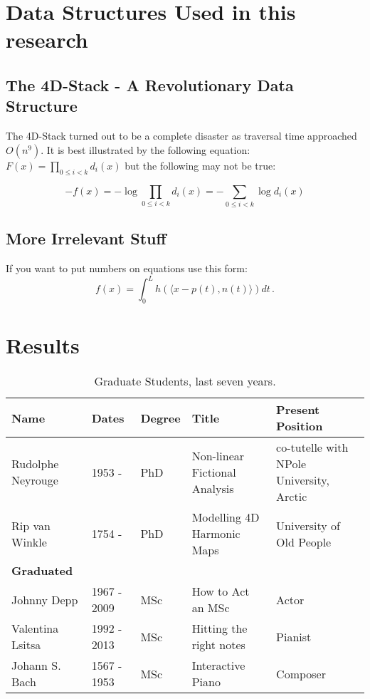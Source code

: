 \documentclass[11pt]{report}
\begin{document}

\chapter{Data Structures Used in this research}
\section{The 4D-Stack - A Revolutionary Data Structure}
The 4D-Stack turned out to be a complete disaster as traversal time approached $O(n^9).$
It is best illustrated by the following equation: $F(x) = \prod_{0\leq i<k}d_i(x)$
but the following may not be true:

\[
-f(x) = - \log \prod_{0\leq i<k}d_i(x) = - \sum_{0\leq i<k} \log d_i(x)
\]


\section{More Irrelevant Stuff}
If you want to put numbers on equations use this form:
\begin{equation}
\label{integralrep}
f(x)=\int_0^L h( \langle x-p(t),n(t) \rangle ) dt\,.
\end{equation}



\chapter{Results}
\begin{table}[tbp]
\begin{tabular}{||l|l|l|p{1.5in}|p{1.2in}||}
\hline
\hline
Name & Dates & Degree & Title & Present Position \\
\hline
Rudolphe Neyrouge & 1953  - & PhD &  Non-linear Fictional Analysis &  co-tutelle with NPole University, Arctic \\
Rip van Winkle & 1754 -  & PhD & Modelling 4D Harmonic Maps & University of Old People \\

\hline
{\bf Graduated} &&&& \\
\hline
Johnny Depp & 1967 - 2009 & MSc & How to Act an MSc & Actor \\
Valentina Lsitsa & 1992 - 2013 & MSc & Hitting the right notes &  Pianist  \\
Johann S. Bach & 1567 - 1953 & MSc & Interactive Piano  & Composer \\\hline
\hline
\end{tabular}
\caption{\label{stud-table} Graduate Students, last seven years.}
\end{table}
\end{document}
